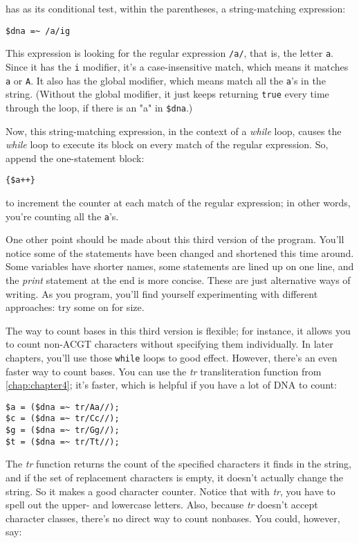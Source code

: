 has as its conditional test, within the parentheses, a string-matching expression:

\begin{lstlisting}
$dna =~ /a/ig 
\end{lstlisting}

This expression is looking for the regular expression \verb|/a/|, that is, the letter \verb|a|. Since it has the \verb|i| modifier, it's a case-insensitive match, which means it matches \verb|a| or \verb|A|. It also has the global modifier, which means match all the \verb|a|'s in the string. (Without the global modifier, it just keeps returning \verb|true| every time through the loop, if there is an "a" in \verb|$dna|.)

Now, this string-matching expression, in the context of a \textit{while} loop, causes the \textit{while} loop to execute its block on every match of the regular expression. So, append the one-statement block:

\begin{lstlisting}
{$a++}
\end{lstlisting}

to increment the counter at each match of the regular expression; in other words, you're counting all the \verb|a|'s. 

One other point should be made about this third version of the program.  You'll notice some of the statements have been changed and shortened this time around. Some variables have shorter names, some statements are lined up on one line, and the \textit{print} statement at the end is more concise. These are just alternative ways of writing. As you program, you'll find yourself experimenting with different approaches: try some on for size.

The way to count bases in this third version is flexible; for instance, it allows you to count non-ACGT characters without specifying them individually. In later chapters, you'll use those \verb|while| loops to good effect. However, there's an even faster way to count bases. You can use the \textit{tr} transliteration function from \autoref{chap:chapter4}; it's faster, which is helpful if you have a lot of DNA to count: 

\begin{lstlisting}
$a = ($dna =~ tr/Aa//);
$c = ($dna =~ tr/Cc//);
$g = ($dna =~ tr/Gg//);
$t = ($dna =~ tr/Tt//);
\end{lstlisting}

The \textit{tr} function returns the count of the specified characters it finds in the string, and if the set of replacement characters is empty, it doesn't actually change the string. So it makes a good character counter. Notice that with \textit{tr}, you have to spell out the upper- and lowercase letters. Also, because \textit{tr} doesn't accept character classes, there's no direct way to count nonbases. You could, however, say: 

